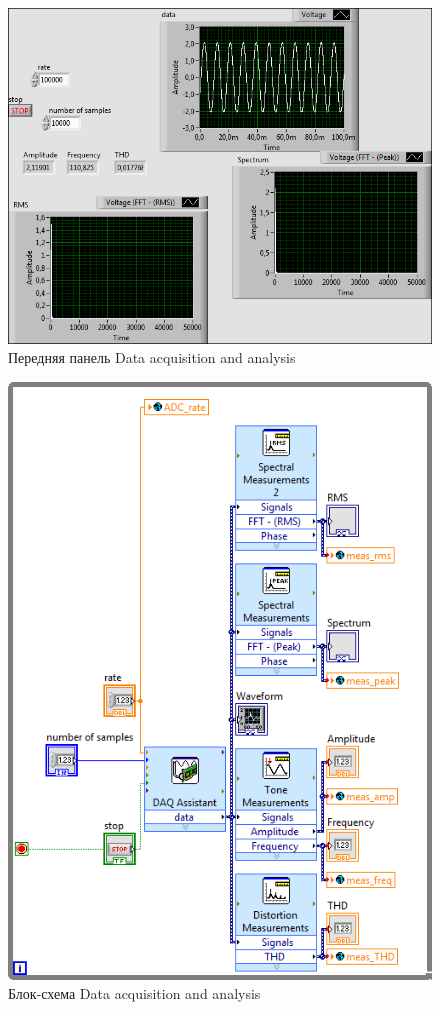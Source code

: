 \documentclass[a4paper,14pt]{article}
\begin{document}
\begin{figure}[H]
	\centering
	\includegraphics[width=\linewidth]{image/daa_vi}
	\caption{Передняя панель Data acquisition and analysis}\label{img:daa_vi}
\end{figure}

\begin{figure}[H]
	\centering
	\includegraphics[width=\linewidth]{image/daa_schema}
	\caption{Блок-схема Data acquisition and analysis}\label{img:daa_schema}
\end{figure}
\end{document}
